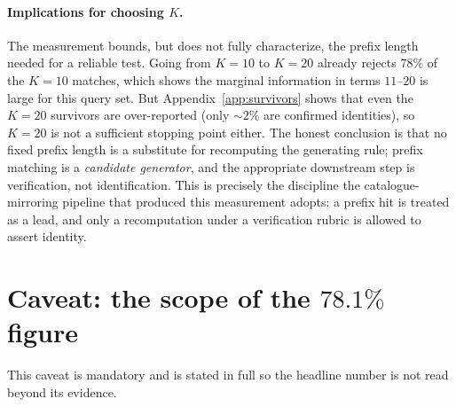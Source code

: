 \documentclass[11pt,a4paper]{article}
\newcommand{\Kten}{K\!=\!10}
\theoremstyle{definition}
\begin{document}
\paragraph{Implications for choosing $K$.} The measurement bounds, but does not
fully characterize, the prefix length needed for a reliable test. Going from
$K=10$ to $K=20$ already rejects $78\%$ of the $\Kten$ matches, which shows the
marginal information in terms $11$--$20$ is large for this query set. But
Appendix~\ref{app:survivors} shows that even the $K=20$ survivors are
over-reported (only $\sim\!2\%$ are confirmed identities), so $K=20$ is not a
sufficient stopping point either. The honest conclusion is that no fixed prefix
length is a substitute for recomputing the generating rule; prefix matching is
a \emph{candidate generator}, and the appropriate downstream step is
verification, not identification. This is precisely the discipline the
catalogue-mirroring pipeline that produced this measurement adopts: a prefix
hit is treated as a lead, and only a recomputation under a verification rubric
is allowed to assert identity.

\section{Caveat: the scope of the $78.1\%$ figure}
\label{sec:caveat}

This caveat is mandatory and is stated in full so the headline number is not
read beyond its evidence.
\end{document}
